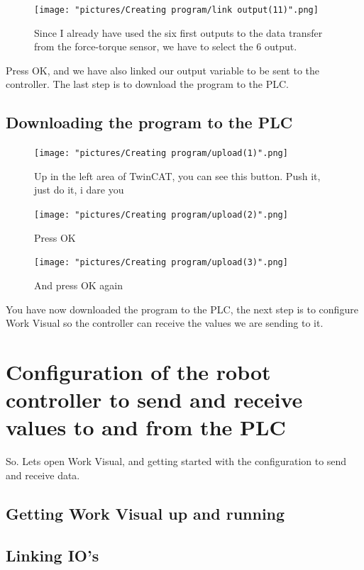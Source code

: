 \documentclass{article}
\begin{document}
\begin{figure}[h!]
    \centering
    \texttt{[image: "pictures/Creating program/link output(11)".png]}
    \caption{Since I already have used the six first outputs to the data transfer from the force-torque sensor, we have to select the 6 output.}
    \label{fig:my_label}
\end{figure}

Press OK, and we have also linked our output variable to be sent to the controller. The last step is to download the program to the PLC.

\newpage

\subsection{Downloading the program to the PLC}



\begin{figure}[h!]
    \centering
    \texttt{[image: "pictures/Creating program/upload(1)".png]}
    \caption{Up in the left area of TwinCAT, you can see this button. Push it, just do it, i dare you}
    \label{fig:my_label}
\end{figure}

\begin{figure}[h!]
    \centering
    \texttt{[image: "pictures/Creating program/upload(2)".png]}
    \caption{Press OK}
    \label{fig:my_label}
\end{figure}

\begin{figure}[h!]
    \centering
    \texttt{[image: "pictures/Creating program/upload(3)".png]}
    \caption{And press OK again}
    \label{fig:my_label}
\end{figure}

You have now downloaded the program to the PLC, the next step is to configure Work Visual so the controller can receive the values we are sending to it.

\newpage

\section{Configuration of the robot controller to send and receive values to and from the PLC}
So. Lets open Work Visual, and getting started with the configuration to send and receive data. 

\subsection{Getting Work Visual up and running}

\subsection{Linking IO's}
\end{document}
